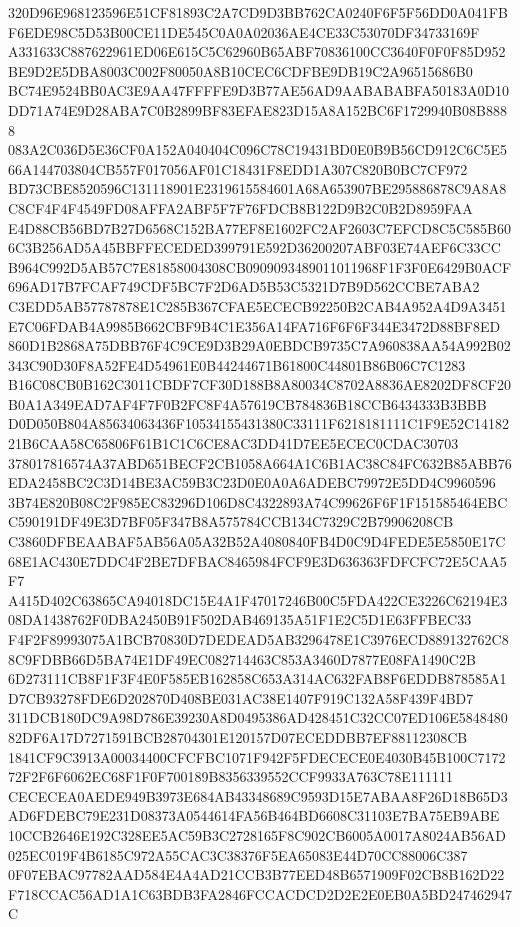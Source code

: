 \documentclass[UTF8,fontset=fandol,zihao=-4,a4paper]{ctexart}
\begin{document}
{{320D96E968123596E51CF81893C2A7CD9D3BB762CA0240F6F5F56DD0A041FBF6EDE98C5D53B00CE11DE545C0A0A02036AE4CE33C53070DF34733169F
A331633C887622961ED06E615C5C62960B65ABF70836100CC3640F0F0F85D952BE9D2E5DBA8003C002F80050A8B10CEC6CDFBE9DB19C2A96515686B0
BC74E9524BB0AC3E9AA47FFFFE9D3B77AE56AD9AABABABFA50183A0D10DD71A74E9D28ABA7C0B2899BF83EFAE823D15A8A152BC6F1729940B08B8888
083A2C036D5E36CF0A152A040404C096C78C19431BD0E0B9B56CD912C6C5E566A144703804CB557F017056AF01C18431F8EDD1A307C820B0BC7CF972
BD73CBE8520596C131118901E2319615584601A68A653907BE295886878C9A8A8C8CF4F4F4549FD08AFFA2ABF5F7F76FDCB8B122D9B2C0B2D8959FAA
E4D88CB56BD7B27D6568C152BA77EF8E1602FC2AF2603C7EFCD8C5C585B606C3B256AD5A45BBFFECEDED399791E592D36200207ABF03E74AEF6C33CC
B964C992D5AB57C7E81858004308CB0909093489011011968F1F3F0E6429B0ACF696AD17B7FCAF749CDF5BC7F2D6AD5B53C5321D7B9D562CCBE7ABA2
C3EDD5AB57787878E1C285B367CFAE5ECECB92250B2CAB4A952A4D9A3451E7C06FDAB4A9985B662CBF9B4C1E356A14FA716F6F6F344E3472D88BF8ED
860D1B2868A75DBB76F4C9CE9D3B29A0EBDCB9735C7A960838AA54A992B02343C90D30F8A52FE4D54961E0B44244671B61800C44801B86B06C7C1283
B16C08CB0B162C3011CBDF7CF30D188B8A80034C8702A8836AE8202DF8CF20B0A1A349EAD7AF4F7F0B2FC8F4A57619CB784836B18CCB6434333B3BBB
D0D050B804A85634063436F10534155431380C33111F6218181111C1F9E52C1418221B6CAA58C65806F61B1C1C6CE8AC3DD41D7EE5ECEC0CDAC30703
378017816574A37ABD651BECF2CB1058A664A1C6B1AC38C84FC632B85ABB76EDA2458BC2C3D14BE3AC59B3C23D0E0A0A6ADEBC79972E5DD4C9960596
3B74E820B08C2F985EC83296D106D8C4322893A74C99626F6F1F151585464EBCC590191DF49E3D7BF05F347B8A575784CCB134C7329C2B79906208CB
C3860DFBEAABAF5AB56A05A32B52A4080840FB4D0C9D4FEDE5E5850E17C68E1AC430E7DDC4F2BE7DFBAC8465984FCF9E3D636363FDFCFC72E5CAA5F7
A415D402C63865CA94018DC15E4A1F47017246B00C5FDA422CE3226C62194E308DA1438762F0DBA2450B91F502DAB469135A51F1E2C5D1E63FFBEC33
F4F2F89993075A1BCB70830D7DEDEAD5AB3296478E1C3976ECD889132762C88C9FDBB66D5BA74E1DF49EC082714463C853A3460D7877E08FA1490C2B
6D273111CB8F1F3F4E0F585EB162858C653A314AC632FAB8F6EDDB878585A1D7CB93278FDE6D202870D408BE031AC38E1407F919C132A58F439F4BD7
311DCB180DC9A98D786E39230A8D0495386AD428451C32CC07ED106E584848082DF6A17D7271591BCB28704301E120157D07ECEDDBB7EF88112308CB
1841CF9C3913A00034400CFCFBC1071F942F5FDECECE0E4030B45B100C717272F2F6F6062EC68F1F0F700189B8356339552CCF9933A763C78E111111
CECECEA0AEDE949B3973E684AB43348689C9593D15E7ABAA8F26D18B65D3AD6FDEBC79E231D08373A0544614FA56B464BD6608C31103E7BA75EB9ABE
10CCB2646E192C328EE5AC59B3C2728165F8C902CB6005A0017A8024AB56AD025EC019F4B6185C972A55CAC3C38376F5EA65083E44D70CC88006C387
0F07EBAC97782AAD584E4A4AD21CCB3B77EED48B6571909F02CB8B162D22F718CCAC56AD1A1C63BDB3FA2846FCCACDCD2D2E2E0EB0A5BD247462947C
}}
\end{document}
